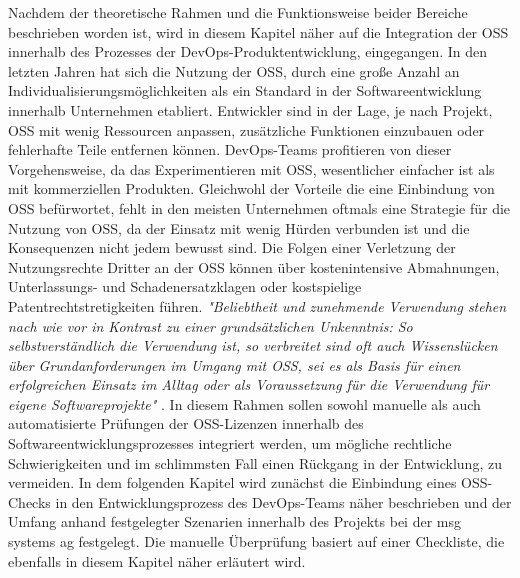 Nachdem der theoretische Rahmen und die Funktionsweise beider Bereiche beschrieben worden ist, wird in diesem Kapitel näher auf die Integration der OSS innerhalb des Prozesses der DevOps-Produktentwicklung, eingegangen. In den letzten Jahren hat sich die Nutzung der OSS, durch eine große Anzahl an Individualisierungsmöglichkeiten als ein Standard in der Softwareentwicklung innerhalb Unternehmen etabliert. Entwickler sind in der Lage, je nach Projekt, OSS mit wenig Ressourcen anpassen, zusätzliche Funktionen einzubauen oder fehlerhafte Teile entfernen können. DevOps-Teams profitieren von dieser Vorgehensweise, da das Experimentieren mit OSS, wesentlicher einfacher ist als mit kommerziellen Produkten. Gleichwohl der Vorteile die eine Einbindung von OSS befürwortet, fehlt in den meisten Unternehmen oftmals eine Strategie für die Nutzung von OSS, da der Einsatz mit wenig Hürden verbunden ist und die Konsequenzen nicht jedem bewusst sind. Die Folgen einer Verletzung der Nutzungsrechte Dritter an der OSS können über kostenintensive Abmahnungen, Unterlassungs- und Schadenersatzklagen oder kostspielige Patentrechtstretigkeiten führen. \textit{"Beliebtheit und zunehmende Verwendung stehen nach wie vor in Kontrast zu einer grundsätzlichen Unkenntnis: So selbstverständlich die Verwendung ist, so verbreitet sind oft auch Wissenslücken über Grundanforderungen im Umgang mit OSS, sei es als Basis für einen erfolgreichen Einsatz im Alltag oder als Voraussetzung für die Verwendung für eigene Softwareprojekte"} \cite[S. 9]{bitkom_open_2016}. In diesem Rahmen sollen sowohl manuelle als auch automatisierte Prüfungen der OSS-Lizenzen innerhalb des Softwareentwicklungsprozesses integriert werden, um mögliche rechtliche Schwierigkeiten und im schlimmsten Fall einen Rückgang in der Entwicklung, zu vermeiden. In dem folgenden Kapitel wird zunächst die Einbindung eines OSS-Checks in den Entwicklungsprozess des DevOps-Teams näher beschrieben und der Umfang anhand festgelegter Szenarien innerhalb des Projekts bei der msg systems ag festgelegt. Die manuelle Überprüfung basiert auf einer Checkliste, die ebenfalls in diesem Kapitel näher erläutert wird. 





